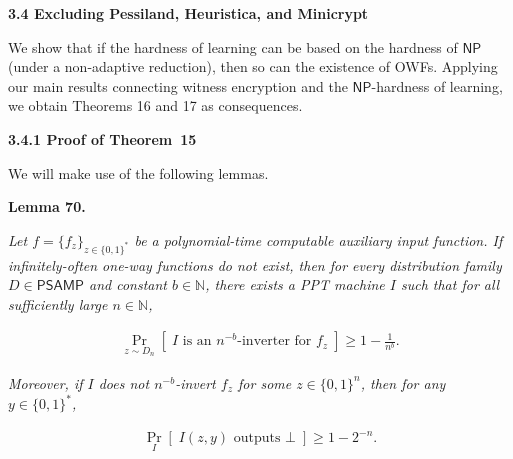 \documentclass[10pt,a4paper]{article}
\begin{document}
\par\medskip\noindent\textbf{
3.4 Excluding Pessiland, Heuristica, and Minicrypt}\par




We show that if the hardness of learning can be based on the hardness of ${\mathsf{NP}}$ (under a non-adaptive reduction), then so can the existence of OWFs. Applying our main results connecting witness encryption and the ${\mathsf{NP}}$-hardness of learning, we obtain Theorems 16 and 17 as consequences.\par




\par\medskip\noindent\textbf{
3.4.1 Proof of Theorem 15
}\par




We will make use of the following lemmas.\par





\par\medskip\noindent\textbf{
\textbf{Lemma 70}\textbf{.}
}\par



\emph{Let $f=\{f_{z}\}_{z\in\{0,1\}^{*}}$ be a polynomial-time computable auxiliary input function. If infinitely-often one-way functions do not exist, then for every distribution family $D\in{\mathsf{P}}{\mathsf{SAMP}}$ and constant $b\in\mathbb{N}$, there exists a PPT machine $I$ such that for all sufficiently large $n\in\mathbb{N}$,}\par


\[\begin{gathered}
\Pr_{z\sim D_{n}}[\;I\text{ is an }n^{-b}\text{-inverter for }f_{z}\;]\geq 1-\frac{1}{n^{b}}.
\end{gathered}\]


\emph{Moreover, if $I$ does not $n^{-b}$-invert $f_{z}$ for some $z\in\{0,1\}^{n}$, then for any $y\in\{0,1\}^{*}$,}\par


\[\begin{gathered}
\Pr_{I}[\;I(z,y)\text{ outputs }\bot\;]\geq 1-2^{-n}.
\end{gathered}\]



\end{document}
